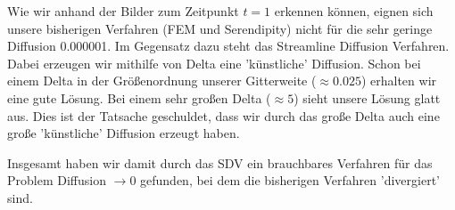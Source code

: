 \begin{figure}[H]
\end{figure}

Wie wir anhand der Bilder zum Zeitpunkt $t=1$ erkennen können, eignen sich unsere bisherigen Verfahren (FEM und Serendipity) nicht für die sehr geringe Diffusion 0.000001. Im Gegensatz dazu steht das Streamline Diffusion Verfahren. Dabei erzeugen wir mithilfe von Delta eine 'künstliche' Diffusion. Schon bei einem Delta in der Größenordnung unserer Gitterweite ($\approx 0.025$)
erhalten wir eine gute Lösung. Bei einem sehr großen Delta 
($\approx 5$) sieht unsere Lösung glatt aus. Dies ist der Tatsache geschuldet, dass wir durch das große Delta auch eine große 'künstliche' Diffusion erzeugt haben. 

Insgesamt haben wir damit durch das SDV ein brauchbares Verfahren für das Problem Diffusion $\to 0$ gefunden, bei dem die bisherigen Verfahren 'divergiert' sind.